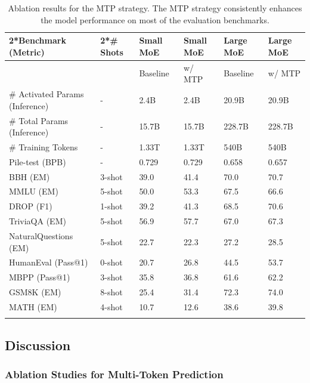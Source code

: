 \documentclass[11pt,a4paper]{article}
\begin{document}
\begin{table}[h]
\caption{Ablation results for the MTP strategy. The MTP strategy consistently enhances the model performance on most of the evaluation benchmarks.}
\begin{tabular}{|l|l|l|l|l|l|}
\hline
2*Benchmark (Metric) & 2*\# Shots & Small MoE & Small MoE & Large MoE & Large MoE \\ \hline
 &  & Baseline & w/ MTP & Baseline & w/ MTP \\ \hline
\# Activated Params (Inference) & - & 2.4B & 2.4B & 20.9B & 20.9B \\ \hline
\# Total Params (Inference) & - & 15.7B & 15.7B & 228.7B & 228.7B \\ \hline
\# Training Tokens & - & 1.33T & 1.33T & 540B & 540B \\ \hline
Pile-test (BPB) & - & 0.729 & 0.729 & 0.658 & 0.657 \\ \hline
BBH (EM) & 3-shot & 39.0 & 41.4 & 70.0 & 70.7 \\ \hline
MMLU (EM) & 5-shot & 50.0 & 53.3 & 67.5 & 66.6 \\ \hline
DROP (F1) & 1-shot & 39.2 & 41.3 & 68.5 & 70.6 \\ \hline
TriviaQA (EM) & 5-shot & 56.9 & 57.7 & 67.0 & 67.3 \\ \hline
NaturalQuestions (EM) & 5-shot & 22.7 & 22.3 & 27.2 & 28.5 \\ \hline
HumanEval (Pass@1) & 0-shot & 20.7 & 26.8 & 44.5 & 53.7 \\ \hline
MBPP (Pass@1) & 3-shot & 35.8 & 36.8 & 61.6 & 62.2 \\ \hline
GSM8K (EM) & 8-shot & 25.4 & 31.4 & 72.3 & 74.0 \\ \hline
MATH (EM) & 4-shot & 10.7 & 12.6 & 38.6 & 39.8 \\ \hline
 &  &  &  &  &  \\ \hline
\end{tabular}
\end{table}

\subsection{Discussion}

\subsubsection{Ablation Studies for Multi-Token Prediction}
\end{document}
